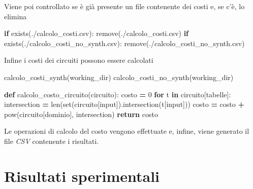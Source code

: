 \documentclass[
  italian,
]{book}
\newenvironment{Shaded}{\begin{snugshade}}{\end{snugshade}}
\newcommand{\BuiltInTok}[1]{#1}
\newcommand{\ControlFlowTok}[1]{\textcolor[rgb]{0.13,0.29,0.53}{\textbf{#1}}}
\newcommand{\DecValTok}[1]{\textcolor[rgb]{0.00,0.00,0.81}{#1}}
\newcommand{\KeywordTok}[1]{\textcolor[rgb]{0.13,0.29,0.53}{\textbf{#1}}}
\newcommand{\NormalTok}[1]{#1}
\newcommand{\OperatorTok}[1]{\textcolor[rgb]{0.81,0.36,0.00}{\textbf{#1}}}
\newcommand{\StringTok}[1]{\textcolor[rgb]{0.31,0.60,0.02}{#1}}
\begin{document}
\newpage

Viene poi controllato se è già presente un file contenente dei costi e, se c'è, lo elimina

\begin{Shaded}
\begin{Highlighting}[]
\ControlFlowTok{if}\NormalTok{ exists(}\StringTok{\textquotesingle{}./calcolo\_costi.csv\textquotesingle{}}\NormalTok{):}
\NormalTok{    remove(}\StringTok{\textquotesingle{}./calcolo\_costi.csv\textquotesingle{}}\NormalTok{)}
\ControlFlowTok{if}\NormalTok{ exists(}\StringTok{\textquotesingle{}./calcolo\_costi\_no\_synth.csv\textquotesingle{}}\NormalTok{):}
\NormalTok{    remove(}\StringTok{\textquotesingle{}./calcolo\_costi\_no\_synth.csv\textquotesingle{}}\NormalTok{)}
\end{Highlighting}
\end{Shaded}

Infine i costi dei circuiti possono essere calcolati

\begin{Shaded}
\begin{Highlighting}[]
\NormalTok{calcolo\_costi\_synth(working\_dir)}
\NormalTok{calcolo\_costi\_no\_synth(working\_dir)}

\KeywordTok{def}\NormalTok{ calcolo\_costo\_circuito(circuito):}
\NormalTok{  costo }\OperatorTok{=} \DecValTok{0}
  \ControlFlowTok{for}\NormalTok{ t }\KeywordTok{in}\NormalTok{ circuito[}\StringTok{\textquotesingle{}tabelle\textquotesingle{}}\NormalTok{]:}
\NormalTok{    intersection }\OperatorTok{=} \BuiltInTok{len}\NormalTok{(}\BuiltInTok{set}\NormalTok{(circuito[}\StringTok{\textquotesingle{}input\textquotesingle{}}\NormalTok{]).intersection(t[}\StringTok{\textquotesingle{}input\textquotesingle{}}\NormalTok{]))}
\NormalTok{    costo }\OperatorTok{=}\NormalTok{ costo }\OperatorTok{+} \BuiltInTok{pow}\NormalTok{(circuito[}\StringTok{\textquotesingle{}dominio\textquotesingle{}}\NormalTok{], intersection)}
  \ControlFlowTok{return}\NormalTok{ costo}
\end{Highlighting}
\end{Shaded}

Le operazioni di calcolo del costo vengono effettuate e, infine, viene generato il file \emph{CSV} contenente i risultati.

\hypertarget{risultati-sperimentali}{%
\chapter{Risultati sperimentali}\label{risultati-sperimentali}}
\end{document}

